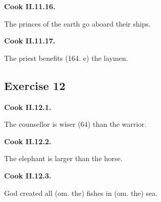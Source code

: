 \par\begin{minipage}{\linewidth}\raggedright
\textbf{Cook II.11.16.}

The princes of the earth go aboard their ships.

\end{minipage}\par\addvspace{4pt}

\par\begin{minipage}{\linewidth}\raggedright
\textbf{Cook II.11.17.}

The priest benefits (164. e) the laymen.

\end{minipage}\par\addvspace{4pt}

\subsection*{Exercise 12}

\par\begin{minipage}{\linewidth}\raggedright
\textbf{Cook II.12.1.}

The counsellor is wiser (64) than the warrior.

\end{minipage}\par\addvspace{4pt}

\par\begin{minipage}{\linewidth}\raggedright
\textbf{Cook II.12.2.}

The elephant is larger than the horse.

\end{minipage}\par\addvspace{4pt}

\par\begin{minipage}{\linewidth}\raggedright
\textbf{Cook II.12.3.}

God created all (om. the) fishes in (om. the) sea.

\end{minipage}\par\addvspace{4pt}

